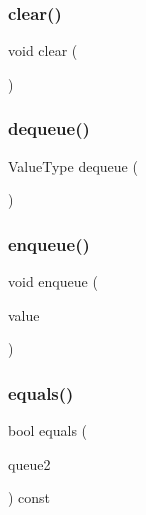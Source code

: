 \mbox{\label{classQueue_ac8bb3912a3ce86b15842e79d0b421204}} 
\subsubsection{\texorpdfstring{clear()}{clear()}}
{\footnotesize\ttfamily void clear (\begin{DoxyParamCaption}{ }\end{DoxyParamCaption})}

\mbox{\label{classQueue_aaee07e371e2370e76e6c42bada727ba2}} 
\subsubsection{\texorpdfstring{dequeue()}{dequeue()}}
{\footnotesize\ttfamily Value\+Type dequeue (\begin{DoxyParamCaption}{ }\end{DoxyParamCaption})}

\mbox{\label{classQueue_a663f69ed5d98f3f167202e9b2d7e7a9a}} 
\subsubsection{\texorpdfstring{enqueue()}{enqueue()}}
{\footnotesize\ttfamily void enqueue (\begin{DoxyParamCaption}\item[{const Value\+Type \&}]{value }\end{DoxyParamCaption})}

\mbox{\label{classQueue_aafa8534374662afc7fedc3e1ffb72c08}} 
\subsubsection{\texorpdfstring{equals()}{equals()}}
{\footnotesize\ttfamily bool equals (\begin{DoxyParamCaption}\item[{const \mbox{\hyperlink{classQueue}{Queue}}$<$ Value\+Type $>$ \&}]{queue2 }\end{DoxyParamCaption}) const}

